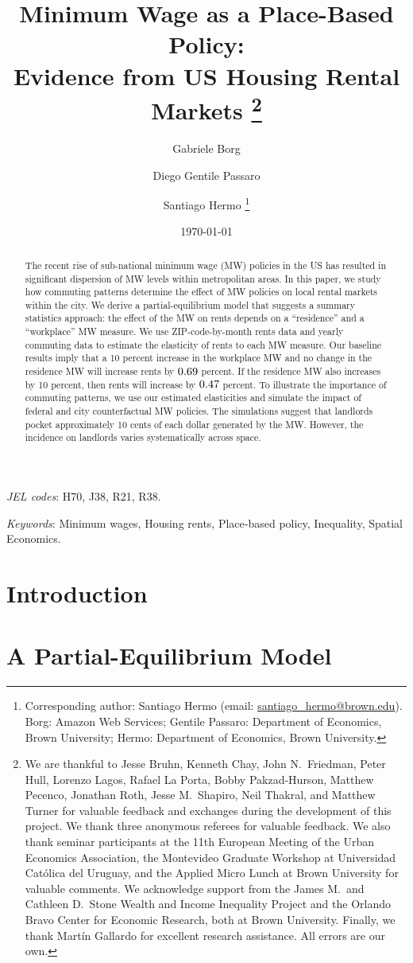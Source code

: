 \documentclass{article}
\title{ Minimum Wage as a Place-Based Policy: \\
        Evidence from US Housing Rental Markets%
        \thanks{We are thankful to Jesse Bruhn, Kenneth Chay, John N.\ Friedman, 
        Peter Hull, Lorenzo Lagos, Rafael La Porta, Bobby Pakzad-Hurson, 
        Matthew Pecenco, Jonathan Roth, Jesse M.\ Shapiro, Neil Thakral, 
        and Matthew Turner for valuable feedback and exchanges during the 
        development of this project.
        We thank three anonymous referees for valuable feedback.
        We also thank seminar participants at 
        the 11th European Meeting of the Urban Economics Association, 
        the Montevideo Graduate Workshop at Universidad Católica del Uruguay, and
        the Applied Micro Lunch at Brown University for valuable comments.
        We acknowledge support from 
        the James M.\ and Cathleen D.\ Stone Wealth and Income Inequality Project and 
        the Orlando Bravo Center for Economic Research, both at Brown University.
        Finally, we thank Martín Gallardo for excellent research assistance.
        All errors are our own.}}
\author{Gabriele Borg \and Diego Gentile Passaro \and Santiago Hermo%
        \footnote{Corresponding author: Santiago Hermo (email: \url{santiago_hermo@brown.edu}).
        Borg: Amazon Web Services;
        Gentile Passaro: Department of Economics, Brown University; 
        Hermo: Department of Economics, Brown University.}}
\date{\today}
\begin{document}

\maketitle

\begin{abstract}
    \noindent
    The recent rise of sub-national minimum wage (MW) policies in the US has 
    resulted in significant dispersion of MW levels within metropolitan areas.
    In this paper, we study how commuting patterns determine the effect of 
    MW policies on local rental markets within the city.
    We derive a partial-equilibrium model that suggests a summary statistics 
    approach: the effect of the MW on rents depends on a ``residence'' and a 
    ``workplace'' MW measure.
    We use ZIP-code-by-month rents data and yearly commuting data to estimate 
    the elasticity of rents to each MW measure.
    Our baseline results imply that a 10 percent increase in the workplace MW 
    and no change in the residence MW will increase rents by $0.69$ 
    percent.
    If the residence MW also increases by 10 percent, then rents will increase 
    by $0.47$ percent.
    To illustrate the importance of commuting patterns, we use our estimated 
    elasticities and simulate the impact of federal and city counterfactual 
    MW policies.
    The simulations suggest that landlords pocket approximately 10 cents of each 
    dollar generated by the MW.
    However, the incidence on landlords varies systematically across space.
\end{abstract}

\noindent \textit{JEL codes}: H70, J38, R21, R38.

\noindent \textit{Keywords}: Minimum wages, Housing rents, Place-based policy, Inequality, Spatial Economics.


\clearpage


\section{Introduction}\label{sec:intro}
    

\section{A Partial-Equilibrium Model}\label{sec:model}
    
\end{document}
